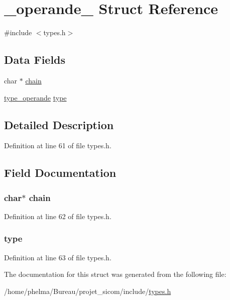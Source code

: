 \hypertarget{struct__operande__}{\section{\-\_\-operande\-\_\- Struct Reference}
\label{struct__operande__}
}


{\ttfamily \#include $<$types.\-h$>$}

\subsection*{Data Fields}
\begin{DoxyCompactItemize}
\item 
char $\ast$ \hyperlink{struct__operande___a1a2e600921a838625caf6c28eb97240c}{chain}
\item 
\hyperlink{types_8h_a2aa311b42a84b9be6f28ba4705923692}{type\-\_\-operande} \hyperlink{struct__operande___a8c1cd31c6332f0be08cd6d98ebc22353}{type}
\end{DoxyCompactItemize}


\subsection{Detailed Description}


Definition at line 61 of file types.\-h.



\subsection{Field Documentation}
\hypertarget{struct__operande___a1a2e600921a838625caf6c28eb97240c}{
\subsubsection[{chain}]{\setlength{\rightskip}{0pt plus 5cm}char$\ast$ chain}}\label{struct__operande___a1a2e600921a838625caf6c28eb97240c}


Definition at line 62 of file types.\-h.

\hypertarget{struct__operande___a8c1cd31c6332f0be08cd6d98ebc22353}{
\subsubsection[{type}]{ type}}\label{struct__operande___a8c1cd31c6332f0be08cd6d98ebc22353}


Definition at line 63 of file types.\-h.



The documentation for this struct was generated from the following file\-:\begin{DoxyCompactItemize}
\item 
/home/phelma/\-Bureau/projet\-\_\-sicom/include/\hyperlink{types_8h}{types.\-h}\end{DoxyCompactItemize}
